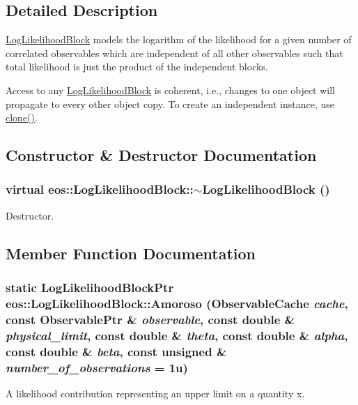 \subsection{Detailed Description}
\hyperlink{classeos_1_1LogLikelihoodBlock}{LogLikelihoodBlock} models the logarithm of the likelihood for a given number of correlated observables which are independent of all other observables such that total likelihood is just the product of the independent blocks.

Access to any \hyperlink{classeos_1_1LogLikelihoodBlock}{LogLikelihoodBlock} is coherent, i.e., changes to one object will propagate to every other object copy. To create an independent instance, use \hyperlink{classeos_1_1LogLikelihoodBlock_a950a255f78736f75b2458e48c30e119f}{clone()}. 

\subsection{Constructor \& Destructor Documentation}
\hypertarget{classeos_1_1LogLikelihoodBlock_a0217895e8d4cf8b69c3086b28ae152a1}{
\subsubsection[{$\sim$LogLikelihoodBlock}]{\setlength{\rightskip}{0pt plus 5cm}virtual eos::LogLikelihoodBlock::$\sim$LogLikelihoodBlock ()}}
\label{classeos_1_1LogLikelihoodBlock_a0217895e8d4cf8b69c3086b28ae152a1}


Destructor. 

\subsection{Member Function Documentation}
\hypertarget{classeos_1_1LogLikelihoodBlock_ae35b8b72185c9ca409a6dfde49de07a1}{
\subsubsection[{Amoroso}]{\setlength{\rightskip}{0pt plus 5cm}static {\bf LogLikelihoodBlockPtr} eos::LogLikelihoodBlock::Amoroso ({\bf ObservableCache} {\em cache}, \/  const {\bf ObservablePtr} \& {\em observable}, \/  const double \& {\em physical\_\-limit}, \/  const double \& {\em theta}, \/  const double \& {\em alpha}, \/  const double \& {\em beta}, \/  const unsigned \& {\em number\_\-of\_\-observations} = {\ttfamily 1u})}}
\label{classeos_1_1LogLikelihoodBlock_ae35b8b72185c9ca409a6dfde49de07a1}
A likelihood contribution representing an upper limit on a quantity x.

